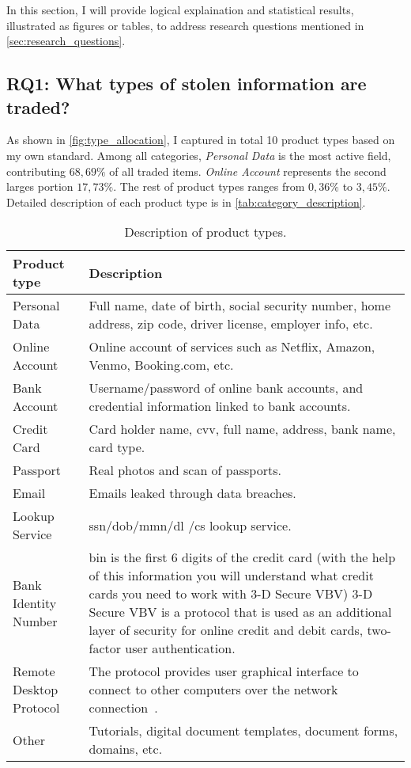 
In this section, I will provide logical explaination and statistical results,
illustrated as figures or tables, to address research questions mentioned in
\autoref{sec:research_questions}.

\subsection{RQ1: What types of stolen information are traded?}
%
As shown in \autoref{fig:type_allocation}, I captured in total 10 product types
based on my own standard. Among all categories, \emph{Personal Data} is the
most active field, contributing \(68,69\%\) of all traded items. \emph{Online Account}
represents the second larges portion \(17,73\%\). The rest of product types ranges
from \(0,36\%\) to \(3,45\%\). Detailed description of each product type is in
\autoref{tab:category_description}.

\begin{table}
    \centering
    \begin{tabularx}{\textwidth}{lX}
        \hline
        Product type & Description\\
        \hline
        Personal Data & Full name, date of birth, social security number, home
        address, zip code, driver license, employer info, etc.\\
        Online Account & Online account of services such as Netflix, Amazon,
        Venmo, Booking.com, etc.\\
        Bank Account & Username/password of online bank accounts, and credential
        information linked to bank accounts.\\
        Credit Card & Card holder name, \acrshort{cvv}, full name, address,
        bank name, card type.\\
        Passport & Real photos and scan of passports.\\
        Email & Emails leaked through data breaches.\\
        Lookup Service & \acrshort{ssn}/\acrshort{dob}/\acrshort{mmn}/\acrshort{dl}
        /\acrshort{cs} lookup service.\\
        Bank Identity Number & \acrshort{bin} is the first 6 digits of the credit card (with
        the help of this information you will understand what credit cards you need to
        work with 3-D Secure VBV) 3-D Secure VBV is a protocol that is used as an
        additional layer of security for online credit and debit cards, two-factor
        user authentication.\\
        Remote Desktop Protocol & The protocol provides user graphical interface to connect
        to other computers over the network connection~\cite{web:rdp_wiki}.\\
        Other & Tutorials, digital document templates, document forms, domains, etc.\\
        \hline
    \end{tabularx}
    \caption{Description of product types.}\label{tab:category_description}
\end{table}

